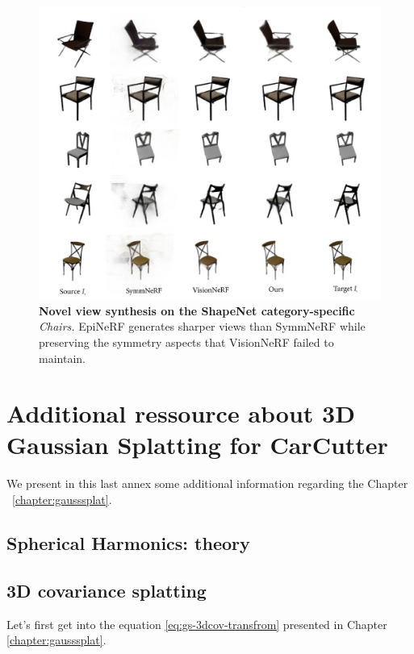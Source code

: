 \begin{figure}[htp!]
    \begin{center}
  \includegraphics[width=\linewidth]{images/epinerf/supp_Chairs_additional_inference.png}
  \caption{\textbf{Novel view synthesis on the ShapeNet category-specific} \textit{Chairs. }EpiNeRF generates sharper views than SymmNeRF while preserving the symmetry aspects that VisionNeRF failed to maintain.}
  \label{fig:supp_chairs}
  \end{center}
\end{figure}

\chapter{Additional ressource about 3D Gaussian Splatting for CarCutter}

We present in this last annex some additional information regarding the Chapter ~\ref{chapter:gausssplat}. 

\section{Spherical Harmonics: theory }
\label{appendix:gs-sh}

\section{3D covariance splatting}
\label{appendix:cov}
Let's first get into the equation \ref{eq:gs-3dcov-transfrom} presented in Chapter \ref{chapter:gausssplat}. 

